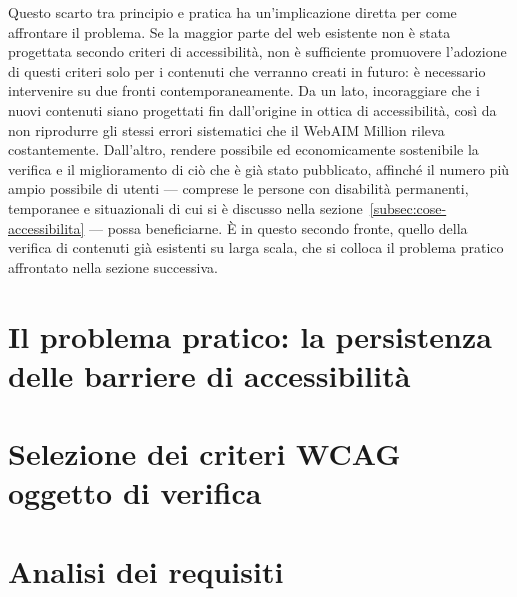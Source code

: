 Questo scarto tra principio e pratica ha un'implicazione diretta per come affrontare il problema. Se la maggior parte del web esistente non è stata progettata secondo criteri di accessibilità, non è sufficiente promuovere l'adozione di questi criteri solo per i contenuti che verranno creati in futuro: è necessario intervenire su due fronti contemporaneamente. Da un lato, incoraggiare che i nuovi contenuti siano progettati fin dall'origine in ottica di accessibilità, così da non riprodurre gli stessi errori sistematici che il WebAIM Million rileva costantemente. Dall'altro, rendere possibile ed economicamente sostenibile la verifica e il miglioramento di ciò che è già stato pubblicato, affinché il numero più ampio possibile di utenti --- comprese le persone con disabilità permanenti, temporanee e situazionali di cui si è discusso nella sezione~\ref{subsec:cose-accessibilita} --- possa beneficiarne. È in questo secondo fronte, quello della verifica di contenuti già esistenti su larga scala, che si colloca il problema pratico affrontato nella sezione successiva.


\section{Il problema pratico: la persistenza delle barriere di accessibilità}
\label{sec:problema-pratico}



\section{Selezione dei criteri WCAG oggetto di verifica}
\label{sec:selezione-criteri}



\section{Analisi dei requisiti}
\label{sec:analisi-requisiti}




